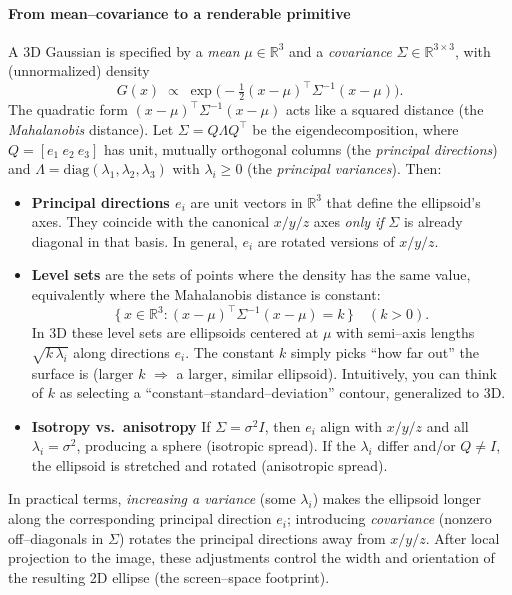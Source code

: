 \begin{enrichment}
\begin{enrichment}
\begin{enrichment}
        \paragraph{From mean–covariance to a renderable primitive}
        A 3D Gaussian is specified by a \emph{mean} $\mu\in\mathbb{R}^3$ and a \emph{covariance} $\Sigma\in\mathbb{R}^{3\times3}$, with (unnormalized) density
        \[
        G(x)\;\propto\;\exp\!\Big(-\tfrac12(x-\mu)^\top \Sigma^{-1}(x-\mu)\Big).
        \]
        The quadratic form $(x-\mu)^\top \Sigma^{-1}(x-\mu)$ acts like a squared distance (the \emph{Mahalanobis} distance). 
        Let $\Sigma=Q\Lambda Q^\top$ be the eigendecomposition, where $Q=[e_1\ e_2\ e_3]$ has unit, mutually orthogonal columns (the \emph{principal directions}) and $\Lambda=\mathrm{diag}(\lambda_1,\lambda_2,\lambda_3)$ with $\lambda_i\ge 0$ (the \emph{principal variances}). Then:
        \begin{itemize}
            \item \textbf{Principal directions $e_i$} are unit vectors in $\mathbb{R}^3$ that define the ellipsoid’s axes. They coincide with the canonical $x/y/z$ axes \emph{only if} $\Sigma$ is already diagonal in that basis. In general, $e_i$ are rotated versions of $x/y/z$.
            \item \textbf{Level sets} are the sets of points where the density has the same value, equivalently where the Mahalanobis distance is constant:
            \[
            \{\,x\in\mathbb{R}^3 : (x-\mu)^\top\Sigma^{-1}(x-\mu)=k\,\}\quad (k>0).
            \]
            In 3D these level sets are ellipsoids centered at $\mu$ with semi–axis lengths $\sqrt{k\,\lambda_i}$ along directions $e_i$. The constant $k$ simply picks “how far out” the surface is (larger $k$ $\Rightarrow$ a larger, similar ellipsoid). Intuitively, you can think of $k$ as selecting a “constant–standard–deviation” contour, generalized to 3D.
            \item \textbf{Isotropy vs.\ anisotropy} If $\Sigma=\sigma^2 I$, then $e_i$ align with $x/y/z$ and all $\lambda_i=\sigma^2$, producing a sphere (isotropic spread). If the $\lambda_i$ differ and/or $Q\neq I$, the ellipsoid is stretched and rotated (anisotropic spread).
        \end{itemize}
        In practical terms, \emph{increasing a variance} (some $\lambda_i$) makes the ellipsoid longer along the corresponding principal direction $e_i$; introducing \emph{covariance} (nonzero off–diagonals in $\Sigma$) rotates the principal directions away from $x/y/z$. After local projection to the image, these adjustments control the width and orientation of the resulting 2D ellipse (the screen–space footprint).
        

\end{enrichment}
\end{enrichment}
\end{enrichment}
